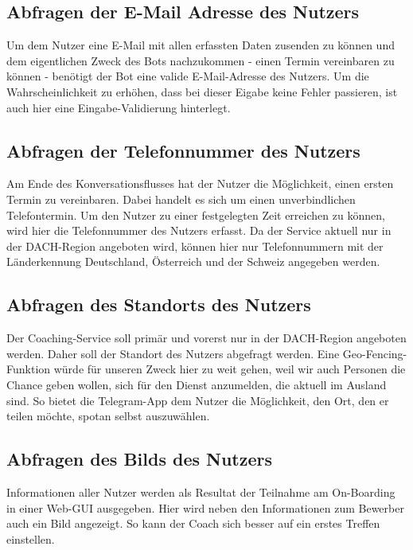         \subsection{Abfragen der E-Mail Adresse des Nutzers}
        Um dem Nutzer eine E-Mail mit allen erfassten Daten zusenden zu können und dem eigentlichen Zweck des Bots nachzukommen - einen Termin vereinbaren zu können - benötigt der Bot eine valide E-Mail-Adresse des Nutzers. Um die Wahrscheinlichkeit zu erhöhen, dass bei dieser Eigabe keine Fehler passieren, ist auch hier eine Eingabe-Validierung hinterlegt.
        
        \subsection{Abfragen der Telefonnummer des Nutzers}
        Am Ende des Konversationsflusses hat der Nutzer die Möglichkeit, einen ersten Termin zu vereinbaren. Dabei handelt es sich um einen unverbindlichen Telefontermin. Um den Nutzer zu einer festgelegten Zeit erreichen zu können, wird hier die Telefonnummer des Nutzers erfasst. Da der Service aktuell nur in der DACH-Region angeboten wird, können hier nur Telefonnummern mit der Länderkennung Deutschland, Österreich und der Schweiz angegeben werden. 
        
        \subsection{Abfragen des Standorts des Nutzers}
        Der Coaching-Service soll primär und vorerst nur in der DACH-Region angeboten werden. Daher soll der Standort des Nutzers abgefragt werden. Eine Geo-Fencing-Funktion würde für unseren Zweck hier zu weit gehen, weil wir auch Personen die Chance geben wollen, sich für den Dienst anzumelden, die aktuell im Ausland sind. So bietet die Telegram-App dem Nutzer die Möglichkeit, den Ort, den er teilen möchte, spotan selbst auszuwählen.
        
        \subsection{Abfragen des Bilds des Nutzers}
        Informationen aller Nutzer werden als Resultat der Teilnahme am On-Boarding in einer Web-GUI ausgegeben. Hier wird neben den Informationen zum Bewerber auch ein Bild angezeigt. So kann der Coach sich besser auf ein erstes Treffen einstellen. 
        
